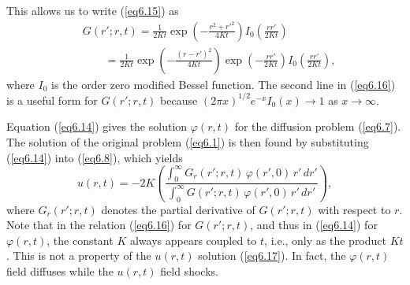\documentclass[10pt]{article}
\begin{document}
This allows us to write (\ref{eq6.15}) as
\begin{equation}                                  %
  \begin{split}
     &G(r';r,t) = \frac{1}{2Kt} \exp\left(-\frac{r^2+r'^2}{4Kt}\right) I_0\left(\frac{rr'}{2Kt}\right)  \\
     & \qquad   = \frac{1}{2Kt} \exp\left(-\frac{(r-r')^2}{4Kt}\right)
	                        \exp\left(-\frac{rr'}{2Kt}\right)      I_0\left(\frac{rr'}{2Kt}\right),
  \end{split}
\label{eq6.16}
\end{equation}
where $I_0$ is the order zero modified Bessel function. The second line in (\ref{eq6.16})
is a useful form for $G(r';r,t)$ because $(2\pi x)^{1/2} e^{-x} I_0(x) \to 1$ as $x \to \infty$.

    Equation (\ref{eq6.14}) gives the solution $\varphi(r,t)$ for the diffusion
problem (\ref{eq6.7}). The solution of the original problem (\ref{eq6.1}) is
then found by substituting (\ref{eq6.14}) into (\ref{eq6.8}), which yields
\begin{equation}                                  %
     u(r,t) = -2K\left(\frac{\int_0^\infty G_r(r';r,t)\,\varphi(r',0)\, r'\, dr'}
                            {\int_0^\infty G  (r';r,t)\,\varphi(r',0)\, r'\, dr'}\right),
\label{eq6.17}
\end{equation}
where $G_r(r';r,t)$ denotes the partial derivative of $G(r';r,t)$ with respect to $r$.
Note that in the relation (\ref{eq6.16}) for $G(r';r,t)$, and thus in (\ref{eq6.14}) for
$\varphi(r,t)$, the constant $K$ always appears coupled to $t$, i.e., only as the product $Kt$.
This is not a property of the $u(r,t)$ solution (\ref{eq6.17}).
In fact, the $\varphi(r,t)$ field diffuses while the $u(r,t)$ field shocks.
\end{document}
